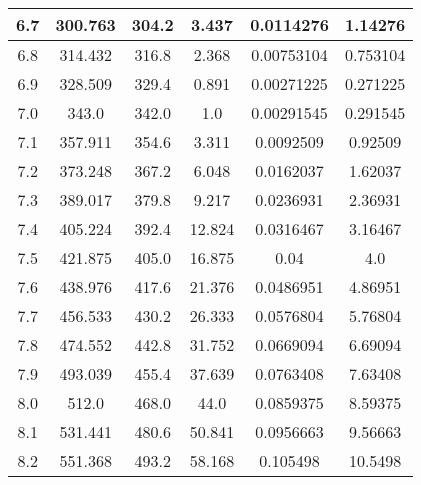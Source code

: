 \begin{table}[h!]
\begin{tabular}{|c|c|c|c|c|c|}
        6.7        & 300.763        & 304.2               & 3.437        & 0.0114276         & 1.14276           \\ \hline
        6.8        & 314.432        & 316.8               & 2.368        & 0.00753104        & 0.753104          \\ \hline
        6.9        & 328.509        & 329.4               & 0.891        & 0.00271225        & 0.271225          \\ \hline
        7.0        & 343.0          & 342.0               & 1.0          & 0.00291545        & 0.291545          \\ \hline
        7.1        & 357.911        & 354.6               & 3.311        & 0.0092509         & 0.92509           \\ \hline
        7.2        & 373.248        & 367.2               & 6.048        & 0.0162037         & 1.62037           \\ \hline
        7.3        & 389.017        & 379.8               & 9.217        & 0.0236931         & 2.36931           \\ \hline
        7.4        & 405.224        & 392.4               & 12.824       & 0.0316467         & 3.16467           \\ \hline
        7.5        & 421.875        & 405.0               & 16.875       & 0.04              & 4.0               \\ \hline
        7.6        & 438.976        & 417.6               & 21.376       & 0.0486951         & 4.86951           \\ \hline
        7.7        & 456.533        & 430.2               & 26.333       & 0.0576804         & 5.76804           \\ \hline
        7.8        & 474.552        & 442.8               & 31.752       & 0.0669094         & 6.69094           \\ \hline
        7.9        & 493.039        & 455.4               & 37.639       & 0.0763408         & 7.63408           \\ \hline
        8.0        & 512.0          & 468.0               & 44.0         & 0.0859375         & 8.59375           \\ \hline
        8.1        & 531.441        & 480.6               & 50.841       & 0.0956663         & 9.56663           \\ \hline
        8.2        & 551.368        & 493.2               & 58.168       & 0.105498          & 10.5498           \\ \hline
    \end{tabular}\label{tab:table}
\end{table}
